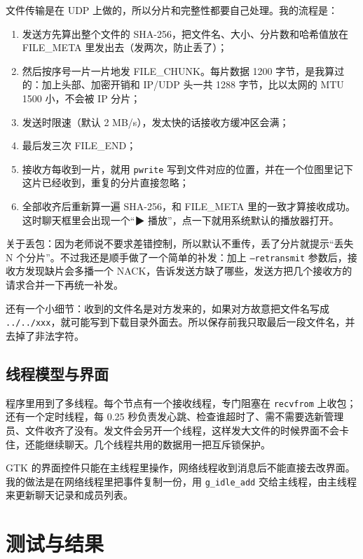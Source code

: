 \documentclass[a4paper,zihao=-4]{ctexart}
\newcommand{\inl}[1]{\texttt{#1}}
\begin{document}
文件传输是在 UDP 上做的，所以分片和完整性都要自己处理。我的流程是：

\begin{enumerate}
  \item 发送方先算出整个文件的 SHA-256，把文件名、大小、分片数和哈希值放在 FILE\_META 里发出去（发两次，防止丢了）；
  \item 然后按序号一片一片地发 FILE\_CHUNK。每片数据 1200 字节，是我算过的：加上头部、加密开销和 IP/UDP 头一共 1288 字节，比以太网的 MTU 1500 小，不会被 IP 分片；
  \item 发送时限速（默认 2 MB/s），发太快的话接收方缓冲区会满；
  \item 最后发三次 FILE\_END；
  \item 接收方每收到一片，就用 \inl{pwrite} 写到文件对应的位置，并在一个位图里记下这片已经收到，重复的分片直接忽略；
  \item 全部收齐后重新算一遍 SHA-256，和 FILE\_META 里的一致才算接收成功。这时聊天框里会出现一个“▶ 播放”，点一下就用系统默认的播放器打开。
\end{enumerate}

关于丢包：因为老师说不要求差错控制，所以默认不重传，丢了分片就提示“丢失 N 个分片”。不过我还是顺手做了一个简单的补发：加上 \inl{--retransmit} 参数后，接收方发现缺片会多播一个 NACK，告诉发送方缺了哪些，发送方把几个接收方的请求合并一下再统一补发。

还有一个小细节：收到的文件名是对方发来的，如果对方故意把文件名写成 \inl{../../xxx}，就可能写到下载目录外面去。所以保存前我只取最后一段文件名，并去掉了非法字符。

\subsection{线程模型与界面}

程序里用到了多线程。每个节点有一个接收线程，专门阻塞在 \inl{recvfrom} 上收包；还有一个定时线程，每 0.25 秒负责发心跳、检查谁超时了、需不需要选新管理员、文件收齐了没有。发文件会另开一个线程，这样发大文件的时候界面不会卡住，还能继续聊天。几个线程共用的数据用一把互斥锁保护。

GTK 的界面控件只能在主线程里操作，网络线程收到消息后不能直接去改界面。我的做法是在网络线程里把事件复制一份，用 \inl{g\_idle\_add} 交给主线程，由主线程来更新聊天记录和成员列表。

\section{测试与结果}
\end{document}
